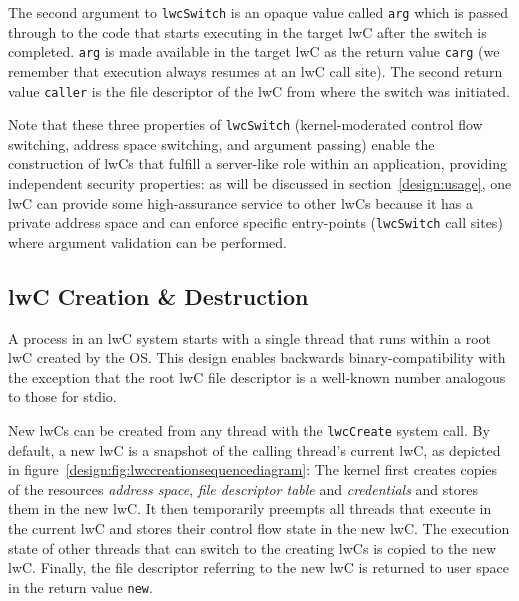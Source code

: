 \documentclass[10pt,twocolumn,a4paper]{article}
\begin{document}
The second argument to \lstinline{lwcSwitch} is an opaque value called \lstinline{arg} which is passed through to the code that starts executing in the target lwC after the switch is completed.
\lstinline{arg} is made available in the target lwC as the return value \lstinline{carg} (we remember that execution always resumes at an lwC call site).
The second return value \lstinline{caller} is the file descriptor of the lwC from where the switch was initiated.
\cite{lwcpaper}

Note that these three properties of \lstinline{lwcSwitch} (kernel-moderated control flow switching, address space switching, and argument passing) enable the construction of lwCs that fulfill a server-like role within an application, providing independent security properties:
as will be discussed in section~\ref{design:usage}, one lwC can provide some high-assurance service to other lwCs because it has a private address space and can enforce specific entry-points (\lstinline{lwcSwitch} call sites) where argument validation can be performed.


\subsection{lwC Creation \& Destruction}\label{design:createdestroy}
A process in an lwC system starts with a single thread that runs within a root lwC created by the OS.
This design enables backwards binary-compatibility with the exception that the root lwC file descriptor is a well-known number analogous to those for stdio.
\cite{lwcpaper}

New lwCs can be created from any thread with the \lstinline{lwcCreate} system call.
By default, a new lwC is a snapshot of the calling thread's current lwC, as depicted in figure~\ref{design:fig:lwccreationsequencediagram}:
The kernel first creates copies of the resources \textit{address space}, \textit{file descriptor table} and \textit{credentials} and stores them in the new lwC.
It then temporarily preempts all threads that execute in the current lwC and stores their control flow state in the new lwC.
The execution state of other threads that can switch to the creating lwCs is copied to the new lwC.
Finally, the file descriptor referring to the new lwC is returned to user space in the return value \lstinline{new}.
\cite{lwcpaper}
\end{document}
